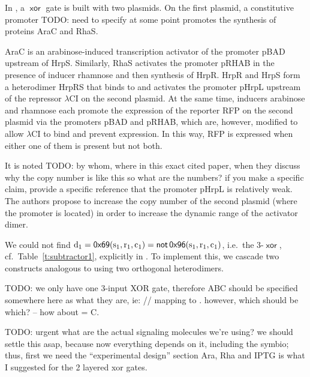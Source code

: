 \documentclass[12pt,notitlepage]{article}
\newcommand{\TODO}[1]{\textrm{\color{red}TODO: #1}}
\newcommand{\NOT}{\ensuremath{\mathop{\mathsf{not}}}\xspace}
\newcommand{\XOR}{\ensuremath{\mathop{\mathsf{xor}}}\xspace}
\newcommand{\hh}[1]{{\color{Purple}#1}}
\newcommand{\ra}[1]{{\color{Blue}#1}}
\begin{document}
In \cite[\href{https://bmcbiol.biomedcentral.com/articles/10.1186/s12915-015-0146-0/figures/5}{Fig.~5}]{Wong2015}, 
a \XOR gate is built with two plasmids. 
%
On the first plasmid, 
a constitutive promoter \TODO{need to specify at some point}
promotes the synthesis of proteins AraC and RhaS.
%
\ra{
AraC is an arabinose-induced transcription activator
of the promoter pBAD upstream of HrpS. 
%
Similarly, RhaS activates the promoter pRHAB in the presence of inducer rhamnose and then synthesis of HrpR.
%
HrpR and HrpS form a heterodimer HrpRS
that binds to and activates the promoter pHrpL 
upstream of the repressor $\lambda$CI 
on the second plasmid.
%
At the same time, inducers arabinose and rhamnose 
each promote the expression
of the reporter RFP on the second plasmid via
the promoters pBAD and pRHAB,
which are, however,
modified to allow $\lambda$CI to bind
and prevent expression.
%
In this way, 
RFP is expressed when either one of them is present but not both. 

It is noted \TODO{by whom, where \hh{in this exact cited paper, when they discuss why the copy number is like this} 
\ra{so what are the numbers? if you make a specific claim, provide a specific reference}
}
that the promoter pHrpL is relatively weak.
%
The authors propose to 
increase the copy number of 
the second plasmid (where the promoter is located)
in order to
increase the dynamic range of the activator dimer.
}

%
\ra{
We could not find
$
	\ce{d_1} 
	= 
	\mathop{\mathsf{0x69}}
	(\ce{s_1}, \ce{r_1}, \ce{c_1})
	=
	\NOT
	\mathop{\mathsf{0x96}}
	(\ce{s_1}, \ce{r_1}, \ce{c_1})
$,
i.e.~the 3-\XOR,
cf.~Table~\ref{t:subtractor1},
explicitly in \cite{NielsenETAL2016}.
%
}
%
\ra{
To implement this,
we cascade
two constructs analogous to \cite{Wong2015}
using two orthogonal heterodimers.
}

\TODO{
we only have one 3-input XOR gate, therefore ABC should be specified
somewhere here
as what they are, ie: 
\ce{s_1}/\ce{r_1}/\ce{c_1} mapping to \ce{d_1}.
%
however, which should be which? --
how about 
\ce{c_1} = C.
}

\TODO{
\ra{urgent}
what are the actual signaling molecules we're using?
we should settle this asap, because now everything depends on it,
including the symbio;
thus, first we need the ``experimental design'' section
\hh{Ara, Rha and IPTG is what I suggested for the 2 layered xor gates.}}
\end{document}
